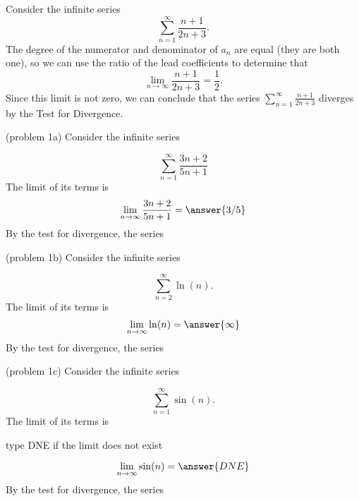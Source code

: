 \documentclass{ximera}
\begin{document}
\begin{example}[example 1]
Consider the infinite series
\[
\sum_{n=1}^\infty \frac{n+1}{2n+3}.
\]
The degree of the numerator and denominator of $a_n$ are equal (they are both one), so we can use the ratio of the lead coefficients to determine that
\[
\lim_{n\to \infty} \frac{n+1}{2n+3} = \frac12.
\]
Since this limit is not zero, we can conclude that the series $\displaystyle{\sum_{n=1}^\infty \frac{n+1}{2n+3}}$ diverges by the Test for Divergence. 
\end{example}

\begin{problem}(problem 1a)
Consider the infinite series

\[
\sum_{n=1}^\infty \frac{3n+2}{5n+1}
\]
The limit of its terms is
\[
\lim_{n\to \infty} \frac{3n+2}{5n+1} = \answer{3/5}
\]
By the test for divergence, the series
\begin{multipleChoice}
\end{multipleChoice}

\end{problem}



\begin{problem}(problem 1b)
Consider the infinite series

\[
\sum_{n=2}^\infty  \ln(n).
\]
The limit of its terms is
\[
\lim_{n\to \infty} \ln(n) = \answer{\infty}
\]
By the test for divergence, the series
\begin{multipleChoice}
\end{multipleChoice}

\end{problem}


\begin{problem}(problem 1c)
Consider the infinite series

\[
 \sum_{n=1}^\infty \sin(n).
\]
The limit of its terms is
\begin{hint}
type DNE if the limit does not exist
\end{hint}
\[
\lim_{n\to \infty} \sin(n) = \answer{DNE}
\]
By the test for divergence, the series
\begin{multipleChoice}
\end{multipleChoice}

\end{problem}
\end{document}
